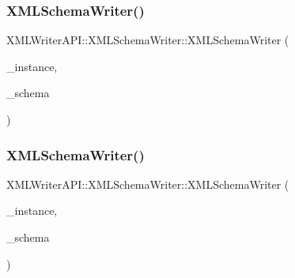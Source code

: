 \mbox{\label{classXMLWriterAPI_1_1XMLSchemaWriter_a2284f6d1214940974d547c380e1ecfc8}} 
\subsubsection{\texorpdfstring{XMLSchemaWriter()}{XMLSchemaWriter()}\hspace{0.1cm}{\footnotesize\ttfamily [2/3]}}
{\footnotesize\ttfamily X\+M\+L\+Writer\+A\+P\+I\+::\+X\+M\+L\+Schema\+Writer\+::\+X\+M\+L\+Schema\+Writer (\begin{DoxyParamCaption}\item[{\mbox{\hyperlink{classXMLWriterAPI_1_1XMLSimpleWriter}{X\+M\+L\+Simple\+Writer}} \&}]{\+\_\+instance,  }\item[{\mbox{\hyperlink{classXMLWriterAPI_1_1XMLSimpleWriter}{X\+M\+L\+Simple\+Writer}} \&}]{\+\_\+schema }\end{DoxyParamCaption})\hspace{0.3cm}{\ttfamily [inline]}}

\mbox{\label{classXMLWriterAPI_1_1XMLSchemaWriter_a2284f6d1214940974d547c380e1ecfc8}} 
\subsubsection{\texorpdfstring{XMLSchemaWriter()}{XMLSchemaWriter()}\hspace{0.1cm}{\footnotesize\ttfamily [3/3]}}
{\footnotesize\ttfamily X\+M\+L\+Writer\+A\+P\+I\+::\+X\+M\+L\+Schema\+Writer\+::\+X\+M\+L\+Schema\+Writer (\begin{DoxyParamCaption}\item[{\mbox{\hyperlink{classXMLWriterAPI_1_1XMLSimpleWriter}{X\+M\+L\+Simple\+Writer}} \&}]{\+\_\+instance,  }\item[{\mbox{\hyperlink{classXMLWriterAPI_1_1XMLSimpleWriter}{X\+M\+L\+Simple\+Writer}} \&}]{\+\_\+schema }\end{DoxyParamCaption})\hspace{0.3cm}{\ttfamily [inline]}}




